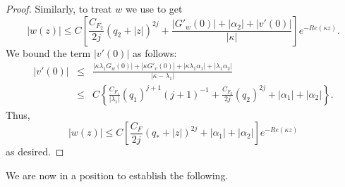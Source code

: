 \documentclass[12pt]{article}
\begin{document}
\begin{proof}
Similarly, to treat $w$ we use \cite[Proposition 2.4.10]{PC} to get
\begin{equation*}
|w(z)| \leq C \left[ \frac{C_{F_2}}{2j} (q_2 + |z|)^{2j} + \frac{\left\vert G'_w(0) \right\vert + |\alpha_2| + \left\vert v'(0) \right\vert}{|\kappa|} \right] e^{-Re(\kappa z)}.
\end{equation*}
%
We bound the term $|v'(0)|$ as follows:
%
\begin{eqnarray*}
|v'(0)| &\leq& \frac{\left\vert \kappa \lambda_1 G_w(0) \right\vert + \left\vert \kappa G'_v(0) \right\vert + |\kappa \lambda_1 \alpha_1| + |\lambda_1 \alpha_2|}{|\kappa - \lambda_1|}\\
&\leq& C \left\{ \frac{C_{F_1}}{|\lambda_1|} (q_1)^{j+1} \left( j+1\right) ^{-1} + \frac{C_{F_2}}{2j} (q_2)^{2j} + |\alpha_1| + |\alpha_2| \right\}.
\end{eqnarray*}
Thus,
%
\[
|w(z)| \leq C \left[ \frac{C_{F}}{2j} (q_* + |z|)^{2j} + |\alpha_1| + |\alpha_2| \right] e^{-Re(\kappa z)}
\]
as desired.
\end{proof}

We are now in a position to establish the following.
\end{document}
